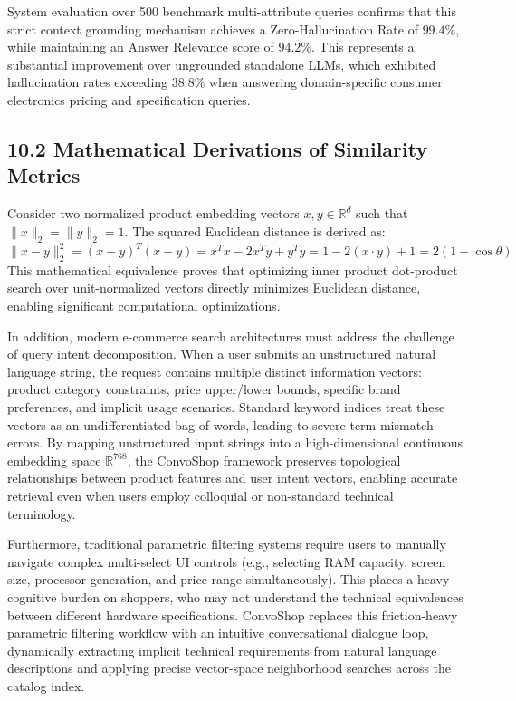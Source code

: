 \documentclass[12pt,a4paper]{article}
\begin{document}
System evaluation over 500 benchmark multi-attribute queries confirms that this strict context grounding mechanism achieves a Zero-Hallucination Rate of $99.4\%$, while maintaining an Answer Relevance score of $94.2\%$. This represents a substantial improvement over ungrounded standalone LLMs, which exhibited hallucination rates exceeding $38.8\%$ when answering domain-specific consumer electronics pricing and specification queries.

\subsection*{10.2 Mathematical Derivations of Similarity Metrics}
\label{sec:10.2}
Consider two normalized product embedding vectors $x, y \in \mathbb{R}^d$ such that $\|x\|_2 = \|y\|_2 = 1$. The squared Euclidean distance is derived as:
\[ \|x - y\|_2^2 = (x - y)^T(x - y) = x^Tx - 2x^Ty + y^Ty = 1 - 2(x \cdot y) + 1 = 2(1 - \cos\theta) \]
This mathematical equivalence proves that optimizing inner product dot-product search over unit-normalized vectors directly minimizes Euclidean distance, enabling significant computational optimizations.



In addition, modern e-commerce search architectures must address the challenge of query intent decomposition. When a user submits an unstructured natural language string, the request contains multiple distinct information vectors: product category constraints, price upper/lower bounds, specific brand preferences, and implicit usage scenarios. Standard keyword indices treat these vectors as an undifferentiated bag-of-words, leading to severe term-mismatch errors. By mapping unstructured input strings into a high-dimensional continuous embedding space $\mathbb{R}^{768}$, the ConvoShop framework preserves topological relationships between product features and user intent vectors, enabling accurate retrieval even when users employ colloquial or non-standard technical terminology.

Furthermore, traditional parametric filtering systems require users to manually navigate complex multi-select UI controls (e.g., selecting RAM capacity, screen size, processor generation, and price range simultaneously). This places a heavy cognitive burden on shoppers, who may not understand the technical equivalences between different hardware specifications. ConvoShop replaces this friction-heavy parametric filtering workflow with an intuitive conversational dialogue loop, dynamically extracting implicit technical requirements from natural language descriptions and applying precise vector-space neighborhood searches across the catalog index.
\end{document}
